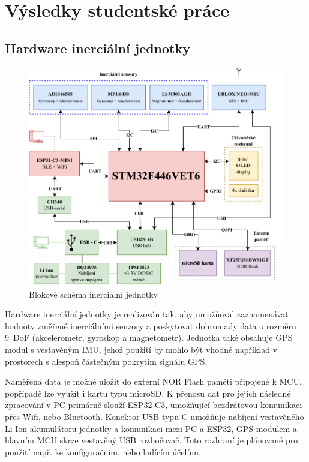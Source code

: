 \chapter{Výsledky studentské práce}
\section{Hardware inerciální jednotky}

\begin{figure}[h]
    \centering
    \includegraphics[width=\textwidth]{obrazky/IMUnav_H00_block}
    \caption{Blokové schéma inerciální jednotky}
\end{figure}

Hardware inerciální jednotky je realizován tak, aby umožňoval zaznamenávat hodnoty změřené inerciálními senzory a poskytovat dohromady data o rozměru 9~DoF (akcelerometr, gyroskop a magnetometr). Jednotka také obsahuje GPS modul s vestavěným IMU, jehož použití by mohlo být vhodné například v prostorech s alespoň částečným pokrytím signálu GPS.

Naměřená data je možné uložit do externí NOR Flash paměti připojené k MCU, popřípadě lze využít i kartu typu microSD. K přenosu dat pro jejich následné zpracování v PC primárně slouží ESP32-C3, umožňující bezdrátovou komunikaci přes Wifi, nebo Bluetooth. Konektor USB typu C umožňuje nabíjení vestavěného Li-Ion akumulátoru jednotky a komunikaci mezi PC a ESP32, GPS modulem a hlavním MCU skrze vestavěný USB rozbočovač. Toto rozhraní je plánované pro použití např. ke konfiguračním, nebo ladícím účelům.

